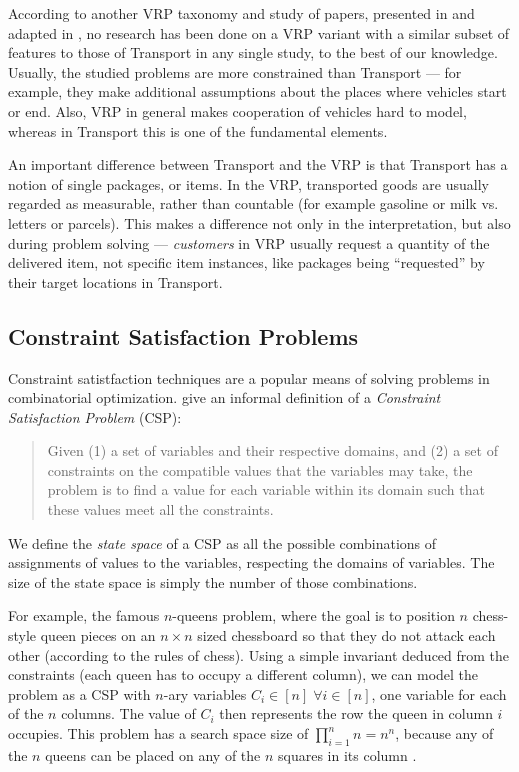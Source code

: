 According to another VRP taxonomy and study of papers, presented in \citet{Eksioglu2009} and adapted in \citet{Braekers2016}, no research has been done on a VRP variant with a similar subset of features to those of Transport in any single study, to the best of our knowledge.
Usually, the studied problems are more constrained than Transport --- for example, they make additional assumptions about the places where vehicles start or end. Also, VRP in general
makes cooperation of vehicles hard to model, whereas in Transport this is one of the fundamental elements.


An important difference between Transport and the VRP is that Transport has a notion of single packages, or items. In the VRP, transported goods are usually regarded as measurable, rather than countable (for example gasoline or milk vs. letters or parcels). This makes a difference not only in the
interpretation, but also during problem solving --- \textit{customers} in VRP usually request
a quantity of the delivered item, not specific item instances, like packages being ``requested''
by their target locations in Transport.

\subsection{Constraint Satisfaction Problems}\label{csp}

Constraint satistfaction techniques are a popular means of solving problems in combinatorial optimization. \citet[Section~8.1]{Ghallab2004} give an informal definition of a
\textit{Constraint Satisfaction Problem} (CSP):
\begin{quote}
Given (1) a set of variables and their respective domains, and (2) a set of constraints on the compatible values that the variables may take, the problem is to find a value for each variable within its domain such that these values meet all the constraints.
\end{quote}

We define the \textit{state space} of a CSP as all the possible combinations of assignments of values to the variables, respecting the domains of variables.
The size of the state space is simply the number of those combinations.

For example, the famous $n$-queens problem, where the goal is to position $n$ chess-style queen pieces on an $n \times n$ sized chessboard so that they do not attack each other (according to the rules of chess). Using a simple invariant deduced from the constraints (each queen has to occupy a different column),
we can model the problem as a CSP with $n$-ary variables $C_i \in [n]\; \forall i \in [n]$, one variable for each of the $n$ columns. The value of $C_i$ then represents the row the queen in column $i$ occupies. This problem has a search space size of $\prod_{i=1}^n n = n^n$, because any of the $n$ queens can be placed on any of the $n$ squares in its column \citep{Russell1995}.


